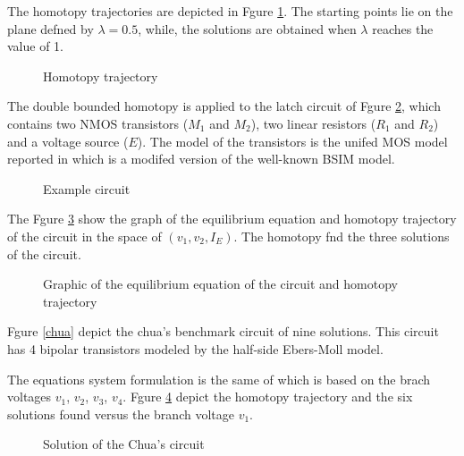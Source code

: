 \documentclass[conference]{IEEEtran}
\begin{document}
The homotopy trajectories  are depicted
in Fgure \ref{homote}. The starting points lie on the plane defned by $\lambda=0.5$, while,
the solutions are obtained when $\lambda$ reaches the value of 1.

\begin{figure}[h]
\centerline{
\epsfxsize=90mm
}
\caption{Homotopy trajectory}
\label{homote}
\end{figure}




The double bounded homotopy is applied to the latch circuit \cite{homo_dobletrazado}  of
Fgure  \ref{circu2}, which contains
two NMOS transistors ($M_1$ and $M_2$), two linear resistors
($R_1$ and $R_2$) and a voltage source ($E$). The model of the transistors is the unifed MOS model
reported in \cite{homo_BSIM} which is a modifed version of the well-known
BSIM model.


\begin{figure}[hbtp]
\centerline{
\epsfxsize=90mm
}
\caption{Example circuit}
\label{circu2}
\end{figure}

The  Fgure \ref{circugraf} show the graph of the equilibrium equation and homotopy trajectory of
the circuit in the space of $(v_1,v_2,I_E)$. The homotopy fnd the three solutions of the circuit.

\begin{figure}[hbtp]
\centerline{
\epsfxsize=90mm
}
\caption{Graphic of the equilibrium equation of the circuit and homotopy trajectory}
\label{circugraf}
\end{figure}





Fgure \ref{chua} depict the chua's benchmark circuit of nine solutions. This circuit has 4 bipolar transistors modeled by the half-side Ebers-Moll model.

The equations system formulation is the same of \cite{homo_chua} which is based
on the brach voltages $v_1$, $v_2$, $v_3$, $v_4$. Fgure \ref{chuaf} depict
the homotopy trajectory and the six solutions found versus the branch voltage $v_1$.

\begin{figure}[hbt]
\centerline{
\epsfxsize=90mm
}
\caption{Solution of the Chua's circuit}
\label{chuaf}
\end{figure}
\end{document}
